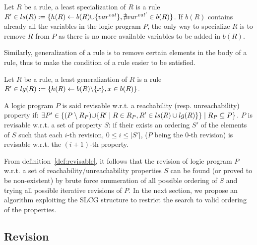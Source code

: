 \begin{definition}
	Let $R$ be a rule, a least specialization of $R$ is a rule $R' \in ls(R) := \{h(R) \leftarrow b(R) \addset{var^{val}}, \nexists var^{val'} \in b(R)\}$.
	If $b(R)$ contains already all the variables in the logic program $P$, the only way to specialize $R$ is to remove $R$ from $P$ as there is no more available variables to be added in $b(R)$.
\end{definition}

    Similarly, generalization of a rule is to remove certain elements in the body of a rule, thus to make the condition of a rule easier to be satisfied.

\begin{definition}
	Let $R$ be a rule, a least generalization of $R$ is a rule $R' \in lg(R) := \{h(R) \leftarrow b(R) \miset{x},  x \in b(R)\}$.
\end{definition}

\begin{definition}[Revisable]\label{def:revisable}
	A logic program $P$ is said revisable w.r.t. a reachability (resp. unreachability) property if:
	$\exists P' \in \{(P \setminus R_P) \addset{R' \mid R \in R_P, R' \in ls(R) \cup lg(R)} \} \mid R_P \subseteq P\}$.
	$P$ is revisable w.r.t. a set of property $S$:
	if their exists an ordering $S'$ of the elements of $S$ such that each $i$-th revision, $0 \leq i \leq |S'|$, ($P$ being the $0$-th revision) is revisable w.r.t. the $(i+1)$-th property.
\end{definition} 

From definition~\ref{def:revisable}, it follows that the revision of logic program $P$ w.r.t. a set of reachability/unreachability properties $S$ can be found (or proved to be non-existent) by brute force enumeration of all possible ordering of $S$ and trying all possible iterative revisions of $P$.
In the next section, we propose an algorithm exploiting the SLCG structure to restrict the search to valid ordering of the properties.
\subsection{Revision}\label{sec:algorithm}

